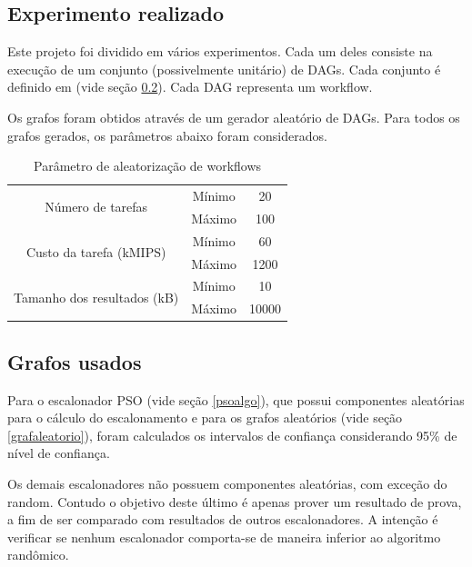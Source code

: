 \documentclass[a4paper,10pt]{article}
\begin{document}
\subsection{Experimento realizado}

Este projeto foi dividido em vários experimentos. Cada um deles consiste na execução de um conjunto (possivelmente unitário)
de DAGs. Cada conjunto é definido em (vide seção \ref{grafosusados}). Cada DAG representa um workflow.

Os grafos foram obtidos através de um gerador aleatório de DAGs. Para todos os grafos gerados,
os parâmetros abaixo foram considerados.

\begin{table}
\centering

  \begin{tabular}{|c|c|c|}  
    \hline
    \multirow{2}{*}{Número de tarefas} & Mínimo & 20\\
                                       & Máximo & 100 \\
    \hline
    \multirow{2}{*}{Custo da tarefa (kMIPS)} & Mínimo & 60 \\
                                             & Máximo & 1200 \\
    \hline
    \multirow{2}{*}{Tamanho dos resultados (kB)} & Mínimo & 10 \\
                                                 & Máximo & 10000 \\
    \hline

  \end{tabular}
  \caption{Parâmetro de aleatorização de workflows}
  \label{tab:param_workflow}
\end{table}

\subsection{Grafos usados}
\label{grafosusados}

Para o escalonador PSO (vide seção \ref{psoalgo}), que possui componentes aleatórias para o cálculo do escalonamento e
para os grafos aleatórios (vide seção \ref{grafaleatorio}), foram calculados os intervalos de confiança considerando 
95\% de nível de confiança.

Os demais escalonadores não possuem componentes aleatórias, com exceção do random. Contudo o objetivo deste último
é apenas prover um resultado de prova, a fim de ser comparado com resultados de outros escalonadores. A intenção é
verificar se nenhum escalonador comporta-se de maneira inferior ao algoritmo randômico.
\end{document}
